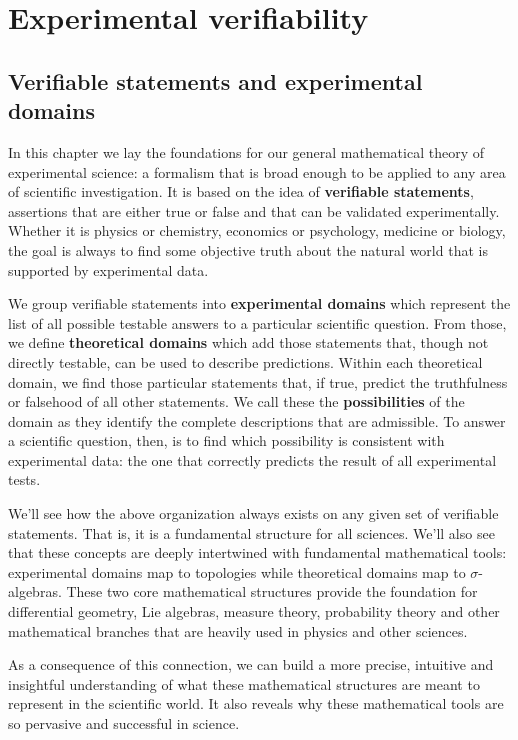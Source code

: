 \documentclass[11pt,letterpaper,fleqn]{memoir} %
\begin{document}

\mainmatter

\part{Experimental verifiability}

\chapter{Verifiable statements and experimental domains}

In this chapter we lay the foundations for our general mathematical theory of experimental science: a formalism that is broad enough to be applied to any area of scientific investigation. It is based on the idea of \textbf{verifiable statements}, assertions that are either true or false and that can be validated experimentally. Whether it is physics or chemistry, economics or psychology, medicine or biology, the goal is always to find some objective truth about the natural world that is supported by experimental data.

We group verifiable statements into \textbf{experimental domains} which represent the list of all possible testable answers to a particular scientific question. From those, we define \textbf{theoretical domains} which add those statements that, though not directly testable, can be used to describe predictions. Within each theoretical domain, we find those particular statements that, if true, predict the truthfulness or falsehood of all other statements. We call these the \textbf{possibilities} of the domain as they identify the complete descriptions that are admissible. To answer a scientific question, then, is to find which possibility is consistent with experimental data: the one that correctly predicts the result of all experimental tests.

We'll see how the above organization always exists on any given set of verifiable statements. That is, it is a fundamental structure for all sciences. We'll also see that these concepts are deeply intertwined with fundamental mathematical tools: experimental domains map to topologies while theoretical domains map to $\sigma$-algebras. These two core mathematical structures provide the foundation for differential geometry, Lie algebras, measure theory, probability theory and other mathematical branches that are heavily used in physics and other sciences.

As a consequence of this connection, we can build a more precise, intuitive and insightful understanding of what these mathematical structures are meant to represent in the scientific world. It also reveals why these mathematical tools are so pervasive and successful in science.
\end{document}

